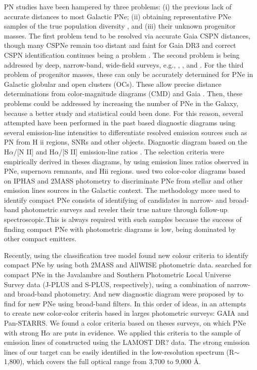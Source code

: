 \documentclass[fleqn,usenatbib]{mnras}
\begin{document}
PN studies have been hampered by three problems:
(i) the previous lack of accurate distances to most Galactic
PNe; (ii) obtaining representative PNe samples of the true
population diversity \citep{Parker:2022}, and (iii) their unknown
progenitor masses. The first problem tend to be
resolved via accurate Gaia CSPN distances, though many
CSPNe remain too distant and faint for Gaia DR3 and correct
CSPN identification continues being a problem \citep{Parker:2022}.
The second problem is being addressed by deep, narrow-band,
wide-field surveys, e.g., \citet{Parker:2005},
\citet{Drew:2005}, and \citet{Drew:2014}. For the third problem
of progenitor masses, these can only be accurately determined for
PNe in Galactic globular and open clusters (OCs). These allow precise
distance determinations from color-magnitude diagrams (CMD) and Gaia
\citep{Fragkou:2022}. Then, these problems could be addressed by increasing the
number of PNe in the Galaxy, because a better study and statistical
could been done. For this reason, several attempted have been performed
in the past based diagnostic diagrams using several emission-line
intensities to differentiate resolved emission
sources such as PN from H {\sc ii} regions, SNRs and other objects.
Diagnostic diagram based on the H{$\alpha$}/[N II] and H{$\alpha$}/[S II]
emission-line ratios \citep{Sabbadin:1977, Fesen:1985, Riesgo:2006}.
The selection criteria were empirically derived in theses diagrams,
by using emission lines ratios observed in PNe, supernova remnants, and H{\sc ii}
regions. \citet{Viironen:2009a, Viironen:2009b} used two color-color diagrams
based on IPHAS and 2MASS photometry to discriminate PNe from stellar and other
emission lines sources in the Galactic context. The methodology more used to
identify compact PNe consists of identifying of candidates in narrow- and
broad-band photometric surveys and reveler their true nature through follow-up
spectroscopic.This is always required with such samples because the success of
finding compact PNe with photometric diagrams is low, being dominated by other
compact emitters.

Recently, \citet{Akras:2019b} using the classification tree model
found new colour criteria to identify compact PNe by
using both 2MASS and AllWISE photometric data. \citet{Gutierrez-Soto:2020}
searched for compact PNe in the Javalambre and Southern Photometric Local
Universe Survey data (J-PLUS and S-PLUS, respectively), using a combination
of narrow- and broad-band photometry. And new diagnostic diagram were proposed
by \citet{Vejar:2019} to find for new PNe using broad-band filters.
In this order of ideas, in an attempts to create new color-color criteria based
in larges photometric surveys: GAIA and Pan-STARRS. We found a color criteria
based on theses surveys, on which PNe with strong H{$\alpha$} are puts in
evidence. We applied this criteria to the sample of emission lines of \citet{Skoda:2020}
constructed using the LAMOST DR? data. The strong emission lines of our target can
be easily identiﬁed in the low-resolution spectrum (R$\sim$1,800), which covers
the full optical range from 3,700 to 9,000 \AA.
\end{document}
